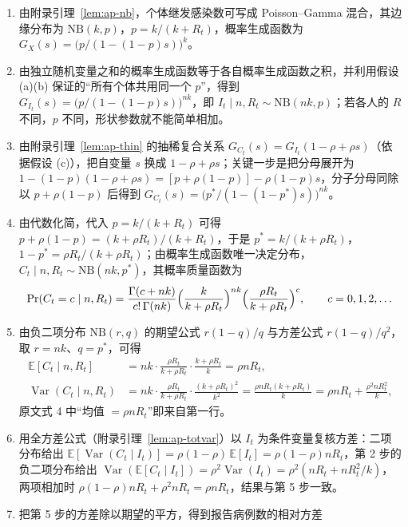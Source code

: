 \begin{enumerate}
\item 由附录引理~\ref{lem:ap-nb}，个体继发感染数可写成 Poisson--Gamma 混合，其边缘分布为 $\mathrm{NB}(k,p)$，$p=k/(k+R_t)$，概率生成函数为 $G_X(s)=\bigl(p/(1-(1-p)s)\bigr)^{k}$。
\item 由独立随机变量之和的概率生成函数等于各自概率生成函数之积，并利用假设 (a)(b) 保证的“所有个体共用同一个 $p$”，得到 $G_{I_t}(s)=\bigl(p/(1-(1-p)s)\bigr)^{nk}$，即 $I_t\mid n,R_t\sim\mathrm{NB}(nk,p)$；若各人的 $R$ 不同，$p$ 不同，形状参数就不能简单相加。
\item 由附录引理~\ref{lem:ap-thin} 的抽稀复合关系 $G_{C_t}(s)=G_{I_t}(1-\rho+\rho s)$（依据假设 (c)），把自变量 $s$ 换成 $1-\rho+\rho s$；关键一步是把分母展开为 $1-(1-p)(1-\rho+\rho s)=[p+\rho(1-p)]-\rho(1-p)s$，分子分母同除以 $p+\rho(1-p)$ 后得到 $G_{C_t}(s)=\bigl(p^*/(1-(1-p^*)s)\bigr)^{nk}$。
\item 由代数化简，代入 $p=k/(k+R_t)$ 可得 $p+\rho(1-p)=(k+\rho R_t)/(k+R_t)$，于是 $p^*=k/(k+\rho R_t)$，$1-p^*=\rho R_t/(k+\rho R_t)$；由概率生成函数唯一决定分布，$C_t\mid n,R_t\sim\mathrm{NB}(nk,p^*)$，其概率质量函数为
\begin{equation*}
\Pr(C_t=c\mid n,R_t)=\frac{\Gamma(c+nk)}{c!\,\Gamma(nk)}\Bigl(\frac{k}{k+\rho R_t}\Bigr)^{nk}\Bigl(\frac{\rho R_t}{k+\rho R_t}\Bigr)^{c},\qquad c=0,1,2,\dots
\end{equation*}
\item 由负二项分布 $\mathrm{NB}(r,q)$ 的期望公式 $r(1-q)/q$ 与方差公式 $r(1-q)/q^2$，取 $r=nk$、$q=p^*$，可得
\begin{align*}
\mathbb{E}[C_t\mid n,R_t]&=nk\cdot\frac{\rho R_t}{k+\rho R_t}\cdot\frac{k+\rho R_t}{k}=\rho nR_t,\\
\operatorname{Var}(C_t\mid n,R_t)&=nk\cdot\frac{\rho R_t}{k+\rho R_t}\cdot\frac{(k+\rho R_t)^2}{k^2}=\frac{\rho nR_t(k+\rho R_t)}{k}=\rho nR_t+\frac{\rho^2nR_t^2}{k},
\end{align*}
原文式 4 中“均值 $=\rho nR_t$”即来自第一行。
\item 用全方差公式（附录引理~\ref{lem:ap-totvar}）以 $I_t$ 为条件变量复核方差：二项分布给出 $\mathbb{E}[\operatorname{Var}(C_t\mid I_t)]=\rho(1-\rho)\,\mathbb{E}[I_t]=\rho(1-\rho)nR_t$，第 2 步的负二项分布给出 $\operatorname{Var}(\mathbb{E}[C_t\mid I_t])=\rho^2\operatorname{Var}(I_t)=\rho^2(nR_t+nR_t^2/k)$，两项相加时 $\rho(1-\rho)nR_t+\rho^2nR_t=\rho nR_t$，结果与第 5 步一致。
\item 把第 5 步的方差除以期望的平方，得到报告病例数的相对方差
\begin{equation}

\end{equation}
\end{enumerate}
